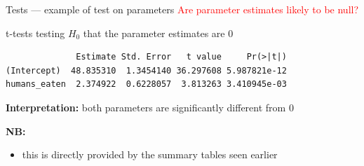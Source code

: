 \documentclass[
  10pt,
  ignorenonframetext,
  aspectratio=169,
  t]{beamer}
\newenvironment{Shaded}{\begin{snugshade}}{\end{snugshade}}
\newcommand{\CommentTok}[1]{\textcolor[rgb]{0.37,0.37,0.37}{#1}}
\newcommand{\FunctionTok}[1]{\textcolor[rgb]{0.28,0.35,0.67}{#1}}
\newcommand{\NormalTok}[1]{\textcolor[rgb]{0.00,0.23,0.31}{#1}}
\newcommand{\SpecialCharTok}[1]{\textcolor[rgb]{0.37,0.37,0.37}{#1}}
\providecommand{\tightlist}{%
  \setlength{\itemsep}{0pt}\setlength{\parskip}{0pt}}
\newcommand{\bluebold}[1]{\textcolor{bluebeamer}{\textbf{#1}}}
\begin{document}
\begin{frame}[fragile]{Tests --- example of test on parameters}
\protect{}\label{tests-example-of-test-on-parameters}
\textcolor{red}{Are parameter estimates likely to be null?}

t-tests testing \(H_0\) that the parameter estimates are 0

\footnotesize

\begin{Shaded}
\end{Shaded}

\begin{verbatim}
              Estimate Std. Error   t value     Pr(>|t|)
(Intercept)  48.835310  1.3454140 36.297608 5.987821e-12
humans_eaten  2.374922  0.6228057  3.813263 3.410945e-03
\end{verbatim}

\normalsize

\bluebold{Interpretation:} both parameters are significantly different
from 0

\textbf{NB:}

\begin{itemize}
\tightlist
\item
  this is directly provided by the summary tables seen earlier
\end{itemize}
\end{frame}
\end{document}
